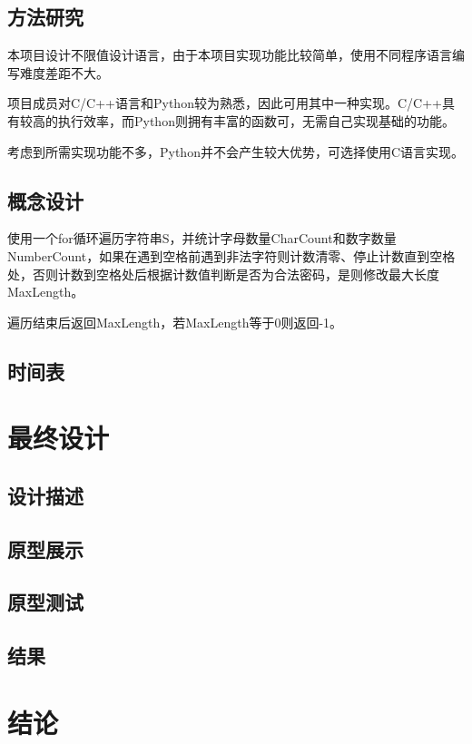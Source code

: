 \begin{spacing}{1.5}
    \subsection{方法研究}
    本项目设计不限值设计语言，由于本项目实现功能比较简单，使用不同程序语言编写难度差距不大。

    项目成员对C/C++语言和Python较为熟悉，因此可用其中一种实现。C/C++具有较高的执行效率，而Python则拥有丰富的函数可，无需自己实现基础的功能。

    考虑到所需实现功能不多，Python并不会产生较大优势，可选择使用C语言实现。

    \subsection{概念设计}
    使用一个for循环遍历字符串S，并统计字母数量CharCount和数字数量NumberCount，如果在遇到空格前遇到非法字符则计数清零、停止计数直到空格处，否则计数到空格处后根据计数值判断是否为合法密码，是则修改最大长度MaxLength。

    遍历结束后返回MaxLength，若MaxLength等于0则返回-1。

    \subsection{时间表}
    \section{最终设计}
    \subsection{设计描述}
    \subsection{原型展示}
    \subsection{原型测试}
    \subsection{结果}
    \section{结论}

\end{spacing}


